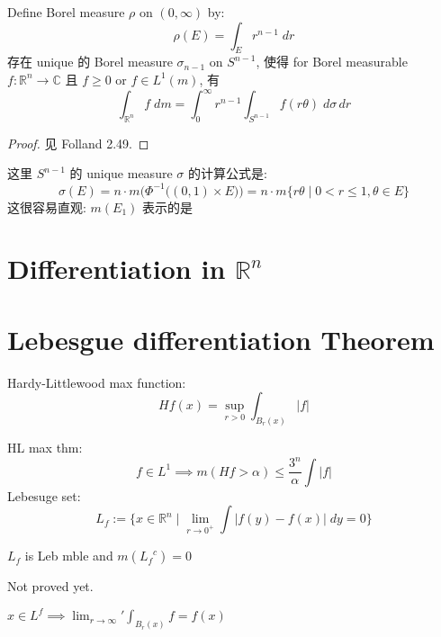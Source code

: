 \documentclass[lang=cn,11pt]{elegantbook}
\begin{document}
\begin{theorem}
Define Borel measure $\rho$ on $(0,\infty)$ by: \[
\rho(E) = \int_E r^{n-1} \; dr
\]
存在 unique 的 Borel measure $\sigma_{n-1}$ on $S^{n-1}$, 使得 for Borel measurable $f:\mathbb{R}^n \to \mathbb{C}$ 且 $f\geq 0$ or $f\in L^1(m)$, 有 \[
\int_{\mathbb{R}^n} f \; dm = \int_0^{\infty}  r^{n-1} \int_{S^{n-1}} f(r\theta) \; d\sigma \, dr
\]
\end{theorem}
\begin{proof}
    见 Folland 2.49.
\end{proof}

\begin{remark}

这里 $S^{n-1}$ 的 unique measure $\sigma$ 的计算公式是: \[
\sigma(E) = n\cdot m\bigg(\Phi^{-1}\big( (0,1)\times E  \big)\bigg) = n\cdot m\{r\theta \mid   0<r \leq 1, \theta \in E\}
\]
这很容易直观: $m(E_1)$ 表示的是
\end{remark}


\chapter{Differentiation in $\mathbb{R}^n$}


















\chapter{Lebesgue differentiation Theorem}

Hardy-Littlewood max function: \[
Hf(x) = \sup_{r > 0} \int_{B_r(x)} |f| 
\]

HL max thm: \[
f \in L^1 \implies m(Hf > \alpha) \leq \frac{3^n}{\alpha} \int |f| 
\]
Lebesuge set: \[
L_f := \{ x \in \mathbb{R}^n \mid \lim_{r \to 0^+} \int |f(y) - f(x) | \; dy = 0   \}
\]


\begin{theorem}
$L_f$ is Leb mble and $m({L_f}^c) = 0$ 
\end{theorem}
Not proved yet.

\begin{corollary}
    $x \in L^f \implies \lim_{r\to \infty} \prime\int_{B_r(x)} f= f(x)$
\end{corollary}
\end{document}
